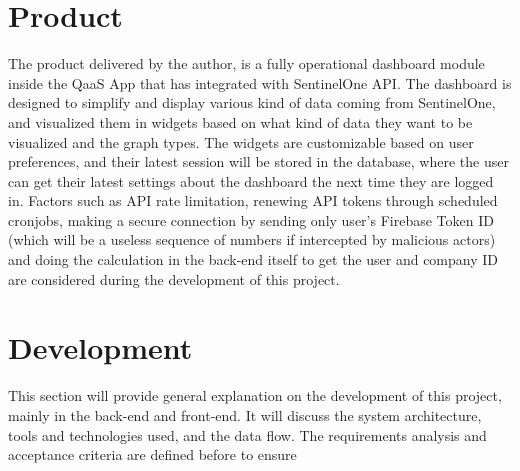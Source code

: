 \section{Product}

The product delivered by the author, is a fully operational dashboard module inside the QaaS App that has integrated with SentinelOne API.
The dashboard is designed to simplify and display various kind of data coming from SentinelOne, and visualized them in widgets based on
what kind of data they want to be visualized and the graph types. The widgets are customizable based on user preferences, and their latest
session will be stored in the database, where the user can get their latest settings about the dashboard the next time they are logged in.
Factors such as API rate limitation, renewing API tokens through scheduled cronjobs, making a secure connection by sending only user's
Firebase Token ID (which will be a useless sequence of numbers if intercepted by malicious actors) and doing the calculation in
the back-end itself to get the user and company ID are considered during the development of this project.





\section{Development}

This section will provide general explanation on the development of this project, mainly in the back-end and front-end. It will discuss the
system architecture, tools and technologies used, and the data flow. The requirements analysis and acceptance criteria are defined before
to ensure

